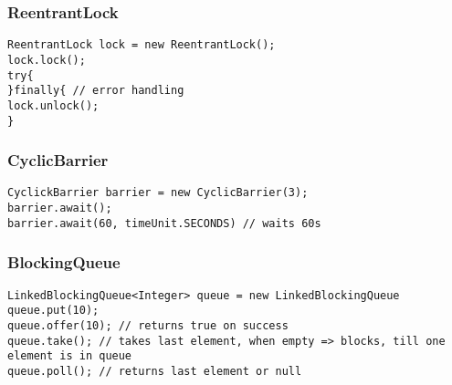 \subsubsection{ReentrantLock}
\begin{verbatim}
ReentrantLock lock = new ReentrantLock();
lock.lock();
try{
}finally{ // error handling
lock.unlock();
}
\end{verbatim}
\subsubsection{CyclicBarrier}
\begin{verbatim}
CyclickBarrier barrier = new CyclicBarrier(3);
barrier.await();
barrier.await(60, timeUnit.SECONDS) // waits 60s
\end{verbatim}
\subsubsection{BlockingQueue}
\begin{verbatim}
LinkedBlockingQueue<Integer> queue = new LinkedBlockingQueue
queue.put(10);
queue.offer(10); // returns true on success
queue.take(); // takes last element, when empty => blocks, till one element is in queue
queue.poll(); // returns last element or null
\end{verbatim}















